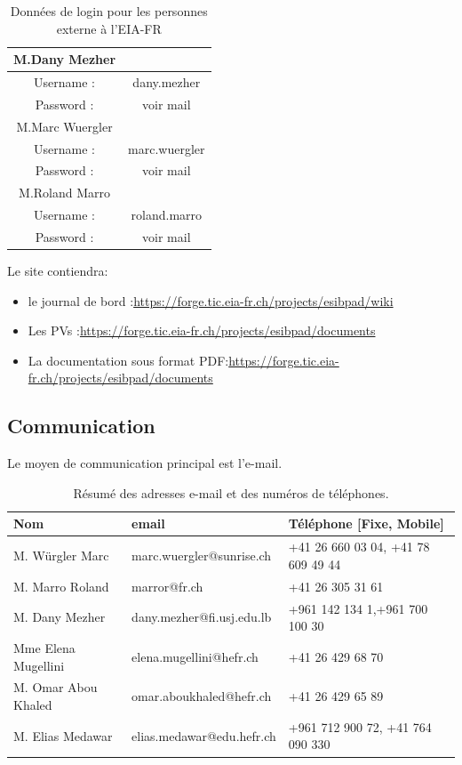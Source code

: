 		
		\begin{table}[H]
			\centering
			\begin{tabular}{|c|c|}
				\hline M.Dany Mezher &  \\ 
				\hline   Username : &  dany.mezher   \\ 
				\hline   Password : & voir mail     \\ [0.2cm]
				\hline M.Marc Wuergler & \\ 
				\hline   Username : &  marc.wuergler  \\ 
				\hline   Password : & voir mail \\ [0.2cm]
				\hline M.Roland Marro &  \\ 
				\hline   Username :&  roland.marro  \\ 
				\hline   Password : & voir mail     \\
				\hline
			\end{tabular} 
			\caption{\label{tab.login}Données de login pour les personnes externe à l'EIA-FR}
		\end{table}
	
		Le site contiendra:
	 	\begin{itemize}
	 		\item le journal de bord :\url{https://forge.tic.eia-fr.ch/projects/esibpad/wiki}
			\item Les PVs :\url{https://forge.tic.eia-fr.ch/projects/esibpad/documents} 
			\item La documentation sous format PDF:\url{https://forge.tic.eia-fr.ch/projects/esibpad/documents} 
		\end{itemize}
	\subsection{Communication}
		Le moyen de communication principal est l'e-mail.\\
		\begin{table}[H]
			\begin{tabular}{|l|l|l|}
				\hline  Nom & email  & Téléphone [Fixe, Mobile]  \\ 
				\hline M. Würgler Marc & marc.wuergler@sunrise.ch  & +41 26 660 03 04, +41 78 609 49 44  \\ 
				\hline M. Marro Roland & marror@fr.ch  & +41 26 305 31 61  \\ 
				\hline M. Dany Mezher	& dany.mezher@fi.usj.edu.lb & +961 142 134 1,+961 700 100 30  \\ 
				\hline Mme Elena Mugellini & elena.mugellini@hefr.ch &  +41 26 429 68 70\\ 
				\hline M. Omar Abou Khaled & omar.aboukhaled@hefr.ch  &  +41 26 429 65 89\\ 
				\hline M. Elias Medawar & elias.medawar@edu.hefr.ch  &  +961 712 900 72, +41 764 090 330\\ 
				\hline 
			\end{tabular} 
			\caption{Résumé des adresses e-mail et des numéros de téléphones.}			
		\end{table}
	
